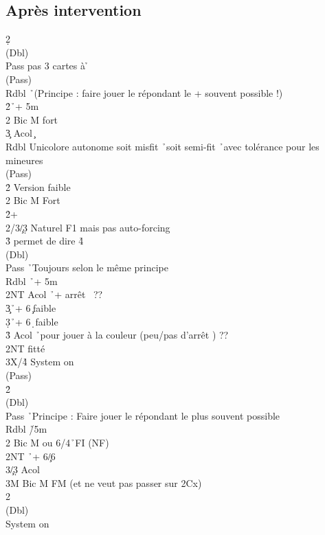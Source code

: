 \documentclass[a4paper]{article}
\begin{document}
\subsection{Après intervention}

\begin{bidtable}
2\d\+\\
(Dbl)\+\\
Pass \> pas 3 cartes à \h \+\\
(Pass)\+\\
Rdbl \h\ (Principe : faire jouer le répondant le + souvent possible !)\\
2\h {}\h\ + 5m\\
2\s \> Bic M fort\\
3\c \> Acol \c \-\-\\
Rdbl \> Unicolore autonome soit misfit \h\ soit semi-fit \h\ avec tolérance pour les mineures\+\\
(Pass)\+\\
2\h \> Version faible\\
2\s \> Bic M Fort\-\-\\
2\h {}+ \h \\
2\s/3\c/3\d \> Naturel F1 mais pas auto-forcing\\
3\h \> permet de dire 4\h \+\\
(Dbl)\+\\
Pass \h\ Toujours selon le même principe\\
Rdbl \h\ + 5m\\
2NT \> Acol \h\ + arrêt \s\ ??\\
3\c {}\h\ + 6\c\ faible\\
3\d {}\h\ + 6\d\ faible\\
3\h \> Acol \h\ pour jouer à la couleur (peu/pas d'arrêt \s ) ??\-\-\\
2NT \> fitté\\
3X/4\h \> System on\-\\
(Pass)\+\\
2\h\+\\
(Dbl)\+\\
Pass \h\ Principe : Faire jouer le répondant le plus souvent possible\\
Rdbl \h /5m\\
2\s \> Bic M ou 6\s /4\h\ FI (NF)\\
2NT \h\ + 6\c /6\d \\
3\c/3\d \> Acol\\
3M \> Bic M FM (et ne veut pas passer sur 2Cx)\-\-\\
2\s\+\\
(Dbl)\+\\
System \> on\-\-\-\-
\end{bidtable}
\end{document}
